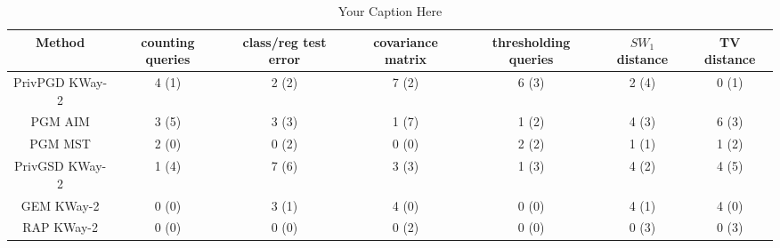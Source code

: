\begin{table}[t!]
\centering
\begin{tabular}{ccccccc}
\toprule
Method & counting queries & class/reg test error & covariance matrix & thresholding queries & $SW_1$ distance & TV distance \\
\midrule
 PrivPGD KWay-2 & 4 (1) & 2 (2) & 7 (2) & 6 (3) & 2 (4) & 0 (1) \\
 PGM AIM & 3 (5) & 3 (3) & 1 (7) & 1 (2) & 4 (3) & 6 (3) \\
 PGM MST & 2 (0) & 0 (2) & 0 (0) & 2 (2) & 1 (1) & 1 (2) \\
 PrivGSD KWay-2 & 1 (4) & 7 (6) & 3 (3) & 1 (3) & 4 (2) & 4 (5) \\
 GEM KWay-2 & 0 (0) & 3 (1) & 4 (0) & 0 (0) & 4 (1) & 4 (0) \\
 RAP  KWay-2 & 0 (0) & 0 (0) & 0 (2) & 0 (0) & 0 (3) & 0 (3) \\
\bottomrule
\end{tabular}
\caption{Your Caption Here}
\label{tab:your_label}
\end{table}